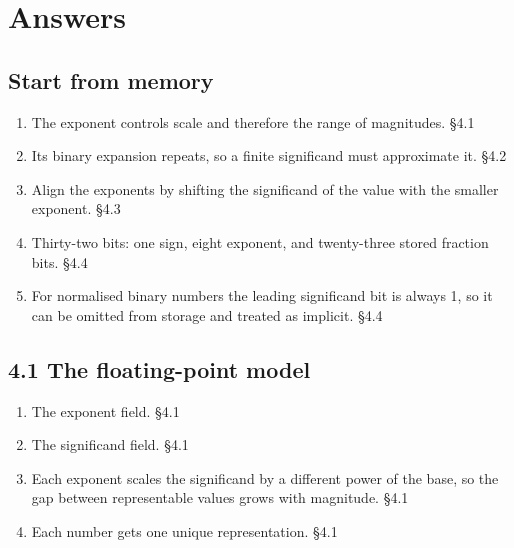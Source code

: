 \documentclass[11pt]{article}
\begin{document}
\clearpage
\section{Answers}
\begin{keepsection}\subsection{Start from memory}

\begin{enumerate}
\item The exponent controls scale and therefore the range of magnitudes. \hfill{\small\color{FAUblue}§4.1}
\item Its binary expansion repeats, so a finite significand must approximate it. \hfill{\small\color{FAUblue}§4.2}
\item Align the exponents by shifting the significand of the value with the smaller exponent. \hfill{\small\color{FAUblue}§4.3}
\item Thirty-two bits: one sign, eight exponent, and twenty-three stored fraction bits. \hfill{\small\color{FAUblue}§4.4}
\item For normalised binary numbers the leading significand bit is always 1, so it can be omitted from storage and treated as implicit. \hfill{\small\color{FAUblue}§4.4}
\end{enumerate}

\end{keepsection}
\begin{keepsection}\subsection{4.1 The floating-point model}

\begin{enumerate}
\item The exponent field. \hfill{\small\color{FAUblue}§4.1}
\item The significand field. \hfill{\small\color{FAUblue}§4.1}
\item Each exponent scales the significand by a different power of the base, so the gap between representable values grows with magnitude. \hfill{\small\color{FAUblue}§4.1}
\item Each number gets one unique representation. \hfill{\small\color{FAUblue}§4.1}
\end{enumerate}

\end{keepsection}
\end{document}

